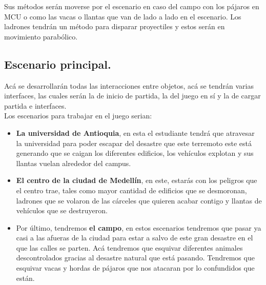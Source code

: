 \documentclass{article}
\begin{document}
Sus métodos serán moverse por el escenario en caso del campo con los pájaros en MCU o como las vacas o llantas que van de lado a lado en el escenario. Los ladrones tendrán un método para disparar proyectiles y estos serán en movimiento parabólico.   

\subsection{Escenario principal.}

Acá se desarrollarán todas las interacciones entre objetos, acá se tendrán varias interfaces, las cuales serán la de inicio de partida, la del juego en sí y la de cargar partida e interfaces.\\

Los escenarios para trabajar en el juego serian:
\begin{itemize}
    \item \textbf{La universidad de Antioquia}, en esta el estudiante tendrá que atravesar la universidad para poder escapar del desastre que este terremoto este está generando que se caigan los diferentes edificios, los vehículos explotan y sus llantas vuelan alrededor del campus.
    \item \textbf{El centro de la ciudad de Medellín}, en este, estarás con los peligros que el centro trae, tales como mayor cantidad de edificios que se desmoronan, ladrones que se volaron de las cárceles que quieren acabar contigo y llantas de vehículos que se destruyeron.
    \item Por último, tendremos \textbf{el campo}, en estos escenarios tendremos que pasar ya casi a las afueras de la ciudad para estar a salvo de este gran desastre en el que las calles se parten. Acá tendremos que esquivar diferentes animales descontrolados gracias al desastre natural que está pasando. Tendremos que esquivar vacas y hordas de pájaros que nos atacaran por lo confundidos que están.
\end{itemize}
\end{document}
